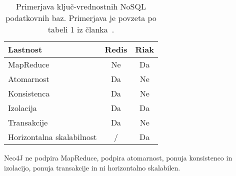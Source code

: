 \begin{table}[H]
    \centering
    \begin{tabularx}{\textwidth}{L S S}
        Lastnost                  & Redis & Riak \\ \hline
        MapReduce                 & Ne    & Da   \\
        Atomarnost                & Da    & Ne   \\
        Konsistenca               & Da    & Ne   \\
        Izolacija                 & Da    & Da   \\
        Transakcije               & Da    & Ne   \\
        Horizontalna skalabilnost & /     & Da   \\
    \end{tabularx}

    \caption{Primerjava ključ-vrednostnih NoSQL podatkovnih baz.
        Primerjava je povzeta po tabeli 1 iz članka~\cite{nosql}.}
    \label{tab:nosql-comparison-key-value}
\end{table}

Neo4J ne podpira MapReduce, podpira atomarnost, ponuja konsistenco in izolacijo,
ponuja transakcije in ni horizontalno skalabilen.
